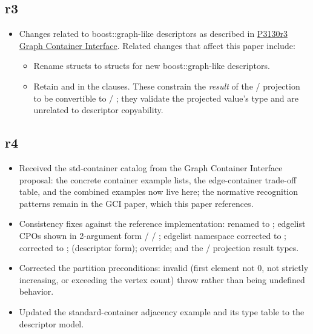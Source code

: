 \subsection*{\paperno r3}

\begin{itemize}
      \item Changes related to boost::graph-like descriptors as described in \href{https://www.wg21.link/P3130r3}{P3130r3 Graph Container Interface}.
            Related changes that affect this paper include:
            \begin{itemize}
                  \item Rename  structs to  structs for new boost::graph-like descriptors.
                  \item Retain  and  in the 
                         clauses. These constrain the \emph{result} of the /
                        projection to be convertible to  / ;
                        they validate the projected value's type and are unrelated to descriptor copyability.
            \end{itemize}
      
\end{itemize}

\subsection*{\paperno r4}
\begin{itemize}
      \item Received the std-container catalog from the Graph Container Interface proposal: the concrete
            container example lists, the edge-container trade-off table, and the combined examples now live
            here; the normative recognition patterns remain in the GCI paper, which this paper references.
      \item Consistency fixes against the reference implementation:  renamed to
            ; edgelist CPOs shown in 2-argument form  /
             / ; edgelist namespace corrected to
            ;  corrected to ;
             (descriptor form);  override; and the
             /  projection result types.
      \item Corrected the  partition preconditions: invalid
             (first element not 0, not strictly increasing, or exceeding the
            vertex count) throw  rather than being undefined behavior.
      \item Updated the standard-container adjacency example and its type table to the descriptor model.
\end{itemize}
